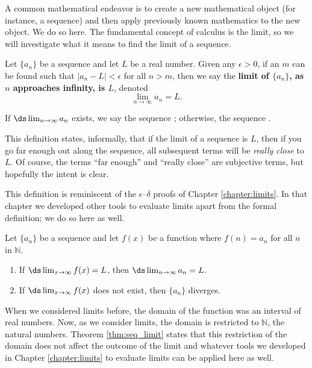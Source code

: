 A common mathematical endeavor is to create a new mathematical object (for instance, a sequence) and then apply previously known mathematics to the new object. We do so here. The fundamental concept of calculus is the limit, so we will investigate what it means to find the limit of a sequence.

{Let $\{a_n\}$ be a sequence and let $L$ be a real number. Given any $\epsilon>0$, if an $m$ can be found such that $|a_n-L|<\epsilon$ for all $n>m$, then we say the \textbf{limit of $\{a_n\}$, as $n$ approaches infinity, is $L$}, denoted $$\lim_{n\to\infty}a_n = L.$$

If $\ds\lim_{n\to\infty} a_n$ exists, we say the sequence ; otherwise, the sequence .
}
\restoreboxwidth


This definition states, informally, that if the limit of a sequence is $L$, then if you go far enough out along the sequence, all subsequent terms will be \emph{really close} to $L$. Of course, the terms ``far enough'' and ``really close'' are subjective terms, but hopefully the intent is clear.

This definition is reminiscent of the $\epsilon$--$\delta$ proofs of Chapter \ref{chapter:limits}. In that chapter we developed other tools to evaluate limits apart from the formal definition; we do so here as well.

{Let $\{a_n\}$ be a sequence and let $f(x)$ be a function where $f(n) = a_n$ for all $n$ in $\mathbb{N}$. 
\begin{enumerate}
\item		If $\ds \lim_{x\to\infty} f(x) = L$, then $\ds\lim_{n\to\infty} a_n = L$.
\item		If $\ds \lim_{x\to\infty} f(x)$ does not exist, then $\{a_n\}$ diverges.
\end{enumerate}
}
\restoreboxwidth

When we considered limits before, the domain of the function was an interval of real numbers. Now, as we consider limits, the domain is restricted to $\mathbb{N}$, the natural numbers. Theorem \ref{thm:seq_limit} states that this restriction of the domain does not affect the outcome of the limit and whatever tools we developed in Chapter \ref{chapter:limits} to evaluate limits can be applied here as well.\\

